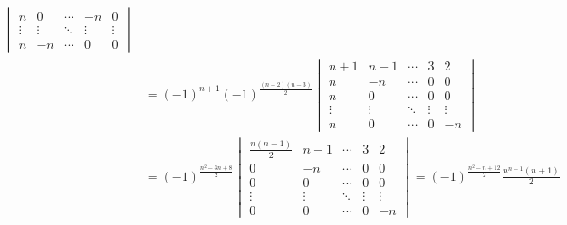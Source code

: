 \begin{enumerate}
\begin{enumerate}
\begin{enumerate}
\begin{align*}
\begin{vmatrix}
                                                     n      & 0      & \cdots & -n     & 0      \\
                                                     \vdots & \vdots & \ddots & \vdots & \vdots \\
                                                     n      & -n     & \cdots & 0      & 0
                                                 \end{vmatrix}                          \\
                                    & =(-1)^{n+1}(-1)^{\frac{(n-2)(n-3)}{2}}
                                  \begin{vmatrix}
                                      n+1    & n-1    & \cdots & 3      & 2      \\
                                      n      & -n     & \cdots & 0      & 0      \\
                                      n      & 0      & \cdots & 0      & 0      \\
                                      \vdots & \vdots & \ddots & \vdots & \vdots \\
                                      n      & 0      & \cdots & 0      & -n
                                  \end{vmatrix}                                         \\
                                    & =(-1)^{\frac{n^2-3n+8}{2}}\begin{vmatrix}
                                                                    \frac{n(n+1)}{2} & n-1    & \cdots & 3      & 2      \\
                                                                    0                & -n     & \cdots & 0      & 0      \\
                                                                    0                & 0      & \cdots & 0      & 0      \\
                                                                    \vdots           & \vdots & \ddots & \vdots & \vdots \\
                                                                    0                & 0      & \cdots & 0      & -n
                                                                \end{vmatrix}=(-1)^{\frac{n^2-n+12}{2}}\frac{n^{n-1}(n+1)}{2}
                              \end{align*}


\end{enumerate}
\end{enumerate}
\end{enumerate}
